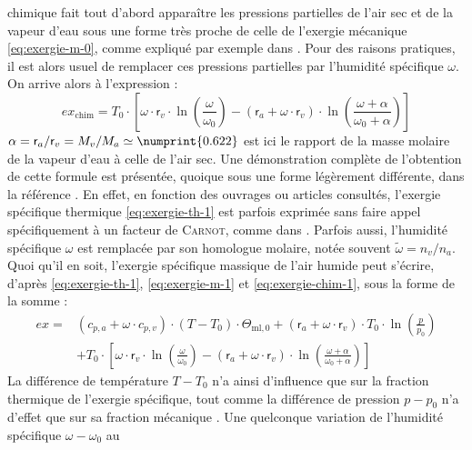 \documentclass[a4paper,11pt]{scrartcl}
\begin{document}
chimique fait tout d'abord apparaître les pressions partielles de l'air sec et
de la vapeur d'eau sous une forme très proche de celle de l'exergie mécanique
\eqref{eq:exergie-m-0}, comme expliqué par exemple dans \cite{TI-BE8015}. Pour des raisons pratiques, il est alors usuel de remplacer ces pressions partielles par l'humidité spécifique $\omega$. On arrive alors à l'expression :
\begin{equation}
	ex_{\text{chim}} = T_0 \cdot \left[ \omega \cdot \mathsf{r}_v \cdot
	\ln\left( \frac{\omega}{\omega_0} \right) - (\mathsf{r}_a + \omega \cdot
	\mathsf{r}_v) \cdot \ln\left( \frac{\omega+\alpha}{\omega_0+\alpha}
	\right) \right] \label{eq:exergie-chim-1}
\end{equation} $\alpha = \mathsf{r}_a/\mathsf{r}_v = M_v/M_a \simeq
\numprint{0.622}$ est ici le rapport de la masse molaire de la vapeur d'eau à
celle de l'air sec. Une démonstration complète de l'obtention de cette formule
est présentée, quoique sous une forme légèrement différente, dans la référence
\cite[page 213]{Bejan-2006}. En effet, en fonction des ouvrages ou articles consultés,
l'exergie spécifique thermique \eqref{eq:exergie-th-1} est parfois exprimée sans
faire appel spécifiquement à un facteur de \textsc{Carnot}, comme dans
\cite{ASHRAE-1979,Bejan-2006}. Parfois aussi, l'humidité spécifique $\omega$ est
remplacée par son homologue molaire, notée souvent $\tilde{\omega} = n_v/n_a$.
Quoi qu'il en soit, l'exergie spécifique massique de l'air humide peut s'écrire,
d'après \eqref{eq:exergie-th-1}, \eqref{eq:exergie-m-1} et
\eqref{eq:exergie-chim-1}, sous la forme de la somme : \begin{equation}
	\begin{split}
		ex = & \left( c_{p,a} + \omega \cdot c_{p,v} \right) \cdot
		(T-T_0) \cdot \Theta_{\text{ml},0} + (\mathsf{r}_a + \omega
		\cdot \mathsf{r}_v) \cdot T_0 \cdot \ln\left( \frac{p}{p_0}
		\right) \\
		& + T_0 \cdot \left[ \omega \cdot \mathsf{r}_v \cdot \ln\left(
		\frac{\omega}{\omega_0} \right) - (\mathsf{r}_a + \omega \cdot
		\mathsf{r}_v) \cdot \ln\left(
		\frac{\omega+\alpha}{\omega_0+\alpha} \right) \right]
	\end{split} \label{eq:exergie-specifique}
\end{equation} La différence de température $T-T_0$ n'a ainsi d'influence que
sur la fraction \og thermique \fg de l'exergie spécifique, tout comme la
différence de pression $p-p_0$ n'a d'effet que sur sa fraction \og mécanique
\fg. Une quelconque variation de l'humidité spécifique $\omega-\omega_0$ au
\end{document}
